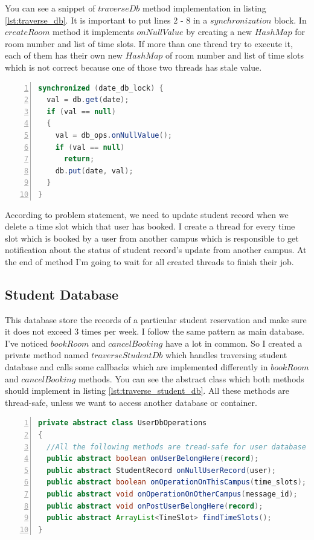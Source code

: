 \documentclass[12pt]{article}
\begin{document}
\par You can see a snippet of $traverseDb$ method implementation in listing \ref{lst:traverse_db}. It is important to put lines 2 - 8 in a $synchronization$ block. In $createRoom$ method it implements $onNullValue$ by creating a new $HashMap$ for room number and list of time slots. If more than one thread try to execute it, each of them has their own new $HashMap$ of room number and list of time slots which is not correct because one of those two threads has stale value.

\begin{lstlisting}[language=java,label={lst:traverse_db},caption={Snippet from traverseDb method},numbers=left]
synchronized (date_db_lock) {
  val = db.get(date);
  if (val == null)
  {
    val = db_ops.onNullValue();
    if (val == null)
      return;
    db.put(date, val);
  }
}		
\end{lstlisting}

\par According to problem statement, we need to update student record when we delete a time slot which that user has booked. I create a thread for every time slot which is booked by a user from another campus which is responsible to get notification about the status of student record's update from another campus. At the end of method I'm going to wait for all created threads to finish their job.

\subsection{Student Database}
This database store the records of a particular student reservation and make sure it does not exceed 3 times per week. I follow the same pattern as main database. I've noticed $bookRoom$ and $cancelBooking$ have a lot in common. So I created a private method named $traverseStudentDb$ which handles traversing student database and calls some callbacks which are implemented differently in $bookRoom$ and $cancelBooking$ methods. You can see the abstract class which both methods should implement in listing \ref{lst:traverse_student_db}. All these methods are thread-safe, unless we want to access another database or container.

\begin{lstlisting}[language=java,label={lst:traverse_student_db},caption={UserDbOperations Abstract Class},numbers=left]
private abstract class UserDbOperations
{
  //All the following methods are tread-safe for user database
  public abstract boolean onUserBelongHere(record);
  public abstract StudentRecord onNullUserRecord(user);
  public abstract boolean onOperationOnThisCampus(time_slots);
  public abstract void onOperationOnOtherCampus(message_id); 
  public abstract void onPostUserBelongHere(record);
  public abstract ArrayList<TimeSlot> findTimeSlots();
}
\end{lstlisting}
\end{document}
